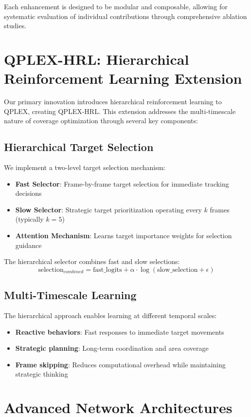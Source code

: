 \documentclass[12pt,a4paper]{report}
\begin{document}
Each enhancement is designed to be modular and composable, allowing for systematic evaluation of individual contributions through comprehensive ablation studies.

\section{QPLEX-HRL: Hierarchical Reinforcement Learning Extension}

Our primary innovation introduces hierarchical reinforcement learning to QPLEX, creating QPLEX-HRL. This extension addresses the multi-timescale nature of coverage optimization through several key components:

\subsection{Hierarchical Target Selection}
We implement a two-level target selection mechanism:
\begin{itemize}
\item \textbf{Fast Selector}: Frame-by-frame target selection for immediate tracking decisions
\item \textbf{Slow Selector}: Strategic target prioritization operating every $k$ frames (typically $k=5$)
\item \textbf{Attention Mechanism}: Learns target importance weights for selection guidance
\end{itemize}

The hierarchical selector combines fast and slow selections:
$$\text{selection}_{combined} = \text{fast\_logits} + \alpha \cdot \log(\text{slow\_selection} + \epsilon)$$

\subsection{Multi-Timescale Learning}
The hierarchical approach enables learning at different temporal scales:
\begin{itemize}
\item \textbf{Reactive behaviors}: Fast responses to immediate target movements
\item \textbf{Strategic planning}: Long-term coordination and area coverage
\item \textbf{Frame skipping}: Reduces computational overhead while maintaining strategic thinking
\end{itemize}

\section{Advanced Network Architectures}
\end{document}
